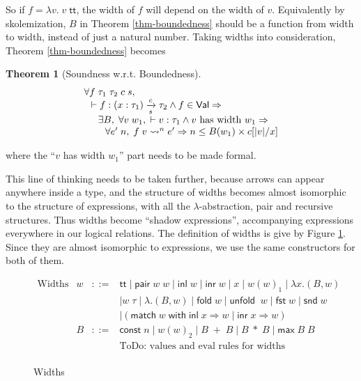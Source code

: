 \documentclass[preprint]{sigplanconf}
\newcommand{\arrow}[4]{#1\xrightarrow[#3]{#2}#4}
\newcommand{\symmatch}{\mathsf{match}}
\newcommand{\symwith}{\mathsf{\;with\;}}
\newcommand{\syminl}{\mathsf{inl}}
\newcommand{\syminr}{\mathsf{inr}}
\newcommand{\symmax}{\mathsf{max}}
\newcommand{\symfold}{\mathsf{fold\;}}
\newcommand{\symunfold}{\mathsf{unfold\;}}
\newcommand{\sympair}{\mathsf{pair}}
\newcommand{\symtt}{\mathsf{tt}}
\newcommand{\symfst}{\mathsf{fst}}
\newcommand{\symsnd}{\mathsf{snd}}
\newtheorem{thm}{Theorem}
\begin{document}
So if $f=\lambda v.\; v\;\symtt$, the width of $f$ will depend on the width of $v$. Equivalently by skolemization, $B$ in Theorem \ref{thm-boundedness} should be a function from width to width, instead of just a natural number. Taking widths into consideration, Theorem \ref{thm-boundedness} becomes
\begin{thm}[\label{thm-boundedness'}Soundness w.r.t. Boundedness]
$$
\begin{array}{l}
\forall f\;\tau_1\;\tau_2\;c\;s, \\
\hspace{0.1in} \vdash f:\arrow{(x:\tau_1)}{c}{s}{\tau_2} \wedge f\in\mathsf{Val}\Rightarrow \\
\hspace{0.2in} \exists B, \;\forall v\;w_1,\; \vdash v:\tau_1 \wedge v\textrm{\ has\ width\ } w_1 \Rightarrow \\
\hspace{0.3in} \forall e'\;n,\; f\;v\leadsto^n e' \Rightarrow n\leq B(w_1)\times c[|v|/x]
\end{array}
$$
\end{thm}
where the ``$v$ has width $w_1$'' part needs to be made formal.

This line of thinking needs to be taken further, because arrows can appear anywhere inside a type, and the structure of widths becomes almost isomorphic to the structure of expressions, with all the $\lambda$-abstraction, pair and recursive structures. Thus widths become ``shadow expressions'', accompanying expressions everywhere in our logical relations. The definition of widths is give by Figure \ref{widths}. Since they are almost isomorphic to expressions, we use the same constructors for both of them.

\begin{figure}
$$\begin{array}{rrcl}
  \textrm{Widths} & w &::=& \symtt \mid \sympair\;w\;w \mid \syminl\;w \mid \syminr\;w \mid x \mid w(w)_1 \mid \lambda x.(B,w) \\
  & & & \mid w\;\tau \mid \lambda.(B,w) \mid \symfold w \mid \symunfold\;w \mid \symfst\;w \mid \symsnd\;w \\
  & & & \mid (\symmatch\;w \symwith\syminl\;x\Rightarrow w\;|\;\syminr\;x\Rightarrow w) \\
  & B &::=& \mathsf{const}\;n \mid w(w)_2 \mid B\;+\;B \mid B\;*\;B \mid \symmax\;B\;B \\
  & & & \textrm{ToDo: values and eval rules for widths} \\
\end{array}$$
\caption{\label{widths}Widths}
\end{figure}
\end{document}
